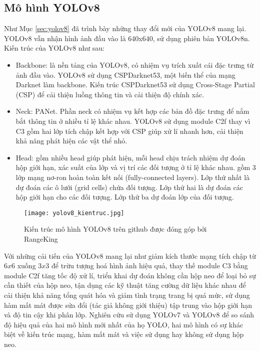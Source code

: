 \documentclass[../the.tex]{subfiles}
\begin{document}
\subsection{Mô hình YOLOv8}
{\fontsize{13}{12} \selectfont

	Như Mục \ref{sec:yolov8} đã trình bày những thay đổi mới của YOLOv8 mang lại. YOLOv8 vẫn nhận hình ảnh đầu vào là 640x640, sử dụng phiên bản YOLOv8n. Kiến trúc của YOLOv8 như sau:
	\begin{itemize}
		\item Backbone: là nền tảng của YOLOv8, có nhiệm vụ trích xuất cái đặc trưng từ ảnh đầu vào. YOLOv8 sử dụng CSPDarknet53, một biến thể của mạng Darknet làm backbone.
		      Kiến trúc CSPDarknet53 sử dụng Cross-Stage Partial (CSP) để cải thiện luồng thông tin và cải thiện độ chính xác.
		\item Neck: PANet. Phần neck có nhiệm vụ kết hợp các bản đồ đặc trưng để nắm bắt thông tin ở nhiều tỉ lệ khác nhau. YOLOv8 sử dụng module C2f thay vì C3 gồm hai lớp tích chập kết hợp với CSP giúp xử lí nhanh hơn, cải thiện khả năng phát hiện các vật thể nhỏ.
		\item Head: gồm nhiều head giúp phát hiện, mỗi head chịu trách nhiệm dự đoán hộp giới hạn, xác suất của lớp và vị trí các đối tượng ở tỉ lệ  khác nhau.
		      gồm 3 lớp mạng nơ-ron hoàn toàn kết nối
		      (fully-connected layers). Lớp thứ nhất
		      là dự đoán các ô lưới (grid cells) chứa đối
		      tượng. Lớp thứ hai là dự đoán các hộp giới hạn cho các đối tượng. Lớp thứ ba dự đoán lớp của đối tượng.
	\end{itemize}

}

\begin{figure}[H]
	\centering
	\texttt{[image: yolov8\_kientruc.jpg]}
	\caption{Kiến trúc mô hình YOLOv8 trên github được đóng góp bởi RangeKing}
	\label{fig:yolo8_kientruc}
\end{figure}

{\fontsize{13}{12} \selectfont

Với những cải tiến của YOLOv8 mang lại như giảm kích thước mạng tích chập từ $6x6$ xuống $3x3$ để trừu tượng hoá hình ảnh hiệu quả, thay thế module C3 bằng module C2f tăng tốc độ xử lí, triển khai dự đoán không cần hộp neo để loại bỏ sự cần thiết của hộp neo,
tận dụng các kỹ thuật tăng cường dữ liệu khác nhau để cải thiện khả năng tổng quát hóa và giảm tình trạng trang bị quá mức, sử dụng hàm mất mát được sửa đổi (tác giả không giới thiệu) tập trung vào hộp giới hạn và độ tin cậy khi phân lớp.
Nghiên cứu sử dụng YOLOv7 và YOLOv8 để so sánh độ hiệu quả của hai mô hình mới nhất của họ YOLO, hai mô hình có sự khác biệt về kiến trúc mạng, hàm mất mát và việc sử dụng hay không sử dụng hộp neo.

}
\end{document}
